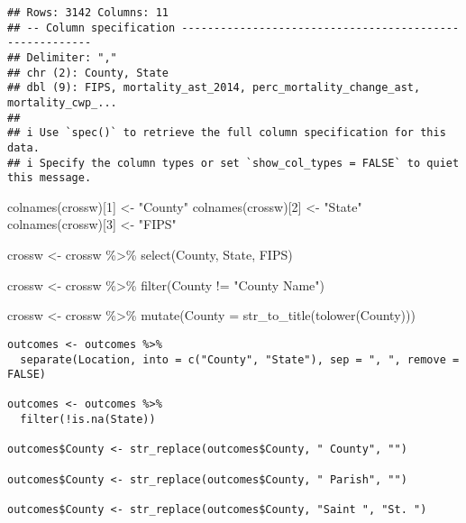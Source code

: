 \documentclass[
]{article}
\newenvironment{Shaded}{\begin{snugshade}}{\end{snugshade}}
\newcommand{\AttributeTok}[1]{\textcolor[rgb]{0.77,0.63,0.00}{#1}}
\newcommand{\DecValTok}[1]{\textcolor[rgb]{0.00,0.00,0.81}{#1}}
\newcommand{\FunctionTok}[1]{\textcolor[rgb]{0.00,0.00,0.00}{#1}}
\newcommand{\NormalTok}[1]{#1}
\newcommand{\OtherTok}[1]{\textcolor[rgb]{0.56,0.35,0.01}{#1}}
\newcommand{\SpecialCharTok}[1]{\textcolor[rgb]{0.00,0.00,0.00}{#1}}
\newcommand{\StringTok}[1]{\textcolor[rgb]{0.31,0.60,0.02}{#1}}
\begin{document}
\begin{verbatim}
## Rows: 3142 Columns: 11
## -- Column specification --------------------------------------------------------
## Delimiter: ","
## chr (2): County, State
## dbl (9): FIPS, mortality_ast_2014, perc_mortality_change_ast, mortality_cwp_...
## 
## i Use `spec()` to retrieve the full column specification for this data.
## i Specify the column types or set `show_col_types = FALSE` to quiet this message.
\end{verbatim}

\begin{Shaded}
\begin{Highlighting}[]
\FunctionTok{colnames}\NormalTok{(crossw)[}\DecValTok{1}\NormalTok{] }\OtherTok{\textless{}{-}} \StringTok{"County"}
\FunctionTok{colnames}\NormalTok{(crossw)[}\DecValTok{2}\NormalTok{] }\OtherTok{\textless{}{-}} \StringTok{"State"}
\FunctionTok{colnames}\NormalTok{(crossw)[}\DecValTok{3}\NormalTok{] }\OtherTok{\textless{}{-}} \StringTok{"FIPS"}

\NormalTok{crossw }\OtherTok{\textless{}{-}}\NormalTok{ crossw }\SpecialCharTok{\%\textgreater{}\%} \FunctionTok{select}\NormalTok{(County, State, FIPS)}

\NormalTok{crossw }\OtherTok{\textless{}{-}}\NormalTok{ crossw }\SpecialCharTok{\%\textgreater{}\%}
  \FunctionTok{filter}\NormalTok{(County }\SpecialCharTok{!=} \StringTok{"County Name"}\NormalTok{)}
\end{Highlighting}
\end{Shaded}

\begin{Shaded}
\begin{Highlighting}[]
\NormalTok{crossw }\OtherTok{\textless{}{-}}\NormalTok{ crossw }\SpecialCharTok{\%\textgreater{}\%}
  \FunctionTok{mutate}\NormalTok{(}\AttributeTok{County =} \FunctionTok{str\_to\_title}\NormalTok{(}\FunctionTok{tolower}\NormalTok{(County)))}
\end{Highlighting}
\end{Shaded}

\hypertarget{r}{%
\label{r}}%
\begin{verbatim}
outcomes <- outcomes %>%
  separate(Location, into = c("County", "State"), sep = ", ", remove = FALSE)

outcomes <- outcomes %>%
  filter(!is.na(State))

outcomes$County <- str_replace(outcomes$County, " County", "")

outcomes$County <- str_replace(outcomes$County, " Parish", "")

outcomes$County <- str_replace(outcomes$County, "Saint ", "St. ")
\end{verbatim}
\end{document}
